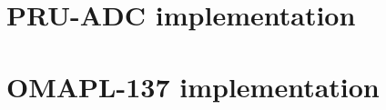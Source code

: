 \begin{appendix}
\chapter{PRU-ADC implementation}

\chapter{OMAPL-137 implementation}

\end{appendix}
